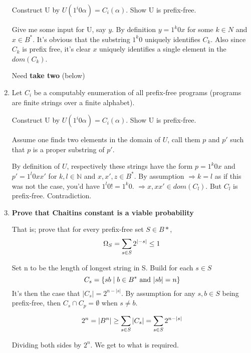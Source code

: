 \documentclass{article}
\newenvironment{answered}{\par\normalfont}{}
\begin{document}
\begin{enumerate}
	Construct U by $U(1^i0\alpha) = C_i(\alpha)$. Show U is prefix-free.

	\begin{answered}
		Give me some input for U, say $y$. By definition $y = 1^k0x$ for some $k \in N$ and $x \in B^*$. It's obvious that the substring $1^k0$ uniquely identifies $C_k$. Also since $C_k$ is prefix free, it's clear $x$ uniquely identifies a single element in the $dom(C_k)$.
	\end{answered}

	Need \textbf{take two} (below)

\item{Let $C_i$ be a computably enumeration of all prefix-free programs (programs are finite strings over a finite alphabet).}
	
	Construct U by $U(1^i0\alpha) = C_i(\alpha)$. Show U is prefix-free.

	\begin{answered}
		Assume one finds two elements in the domain of $U$, call them $p$ and $p'$ such that $p$ is a proper substring of $p'$.

		By definition of $U$, respectively these strings have the form $p = 1^k0x$ and $p' = 1^l0xx'$ for $k,l \in \mathbb{N}$ and $x,x',z \in B^*$. By assumption $\Rightarrow k = l$ as if this was not the case, you'd have $1^l0 != 1^k0$. $\Rightarrow x, xx' \in dom(C_{l})$. But $C_{l}$ is prefix-free. Contradiction.
	\end{answered}

\item{\textbf{Prove that Chaitins constant is a viable probability}}

	\begin{answered}
		That is; prove that for every prefix-free set $S \in B*$,
		\begin{equation}
			\Omega_S=\sum_{s \in S} 2^{|-s|} \leq 1 \notag \\
		\end{equation}

		Set n to be the length of longest string in S. Build for each $s\in S$
		\begin{equation}
			C_{s} = \{sb \mid b \in B^* \text{ and } |sb| = n\} \notag \\
		\end{equation}
		It's then the case that $|C_{s}| = 2^{n-|s|}$. By assumption for any $s,b \in S$ being prefix-free, then $C_s \cap C_p = \emptyset$ when $s \not = b$.

		\begin{equation}
			2^n = |B^n| \geq \sum_{s \in S} |C_s| = \sum_{s \in S} 2^{n - |s|} \notag
		\end{equation}

		Dividing both sides by $2^n$. We get to what is required.
	\end{answered}

\end{enumerate}
\end{document}
